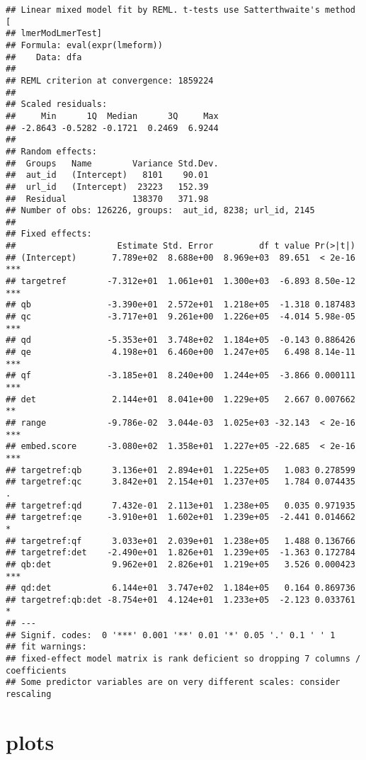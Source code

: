 \documentclass[
  12pt,
  oneside]{book}
\begin{document}
\begin{verbatim}
## Linear mixed model fit by REML. t-tests use Satterthwaite's method [
## lmerModLmerTest]
## Formula: eval(expr(lmeform))
##    Data: dfa
## 
## REML criterion at convergence: 1859224
## 
## Scaled residuals: 
##     Min      1Q  Median      3Q     Max 
## -2.8643 -0.5282 -0.1721  0.2469  6.9244 
## 
## Random effects:
##  Groups   Name        Variance Std.Dev.
##  aut_id   (Intercept)   8101    90.01  
##  url_id   (Intercept)  23223   152.39  
##  Residual             138370   371.98  
## Number of obs: 126226, groups:  aut_id, 8238; url_id, 2145
## 
## Fixed effects:
##                    Estimate Std. Error         df t value Pr(>|t|)    
## (Intercept)       7.789e+02  8.688e+00  8.969e+03  89.651  < 2e-16 ***
## targetref        -7.312e+01  1.061e+01  1.300e+03  -6.893 8.50e-12 ***
## qb               -3.390e+01  2.572e+01  1.218e+05  -1.318 0.187483    
## qc               -3.717e+01  9.261e+00  1.226e+05  -4.014 5.98e-05 ***
## qd               -5.353e+01  3.748e+02  1.184e+05  -0.143 0.886426    
## qe                4.198e+01  6.460e+00  1.247e+05   6.498 8.14e-11 ***
## qf               -3.185e+01  8.240e+00  1.244e+05  -3.866 0.000111 ***
## det               2.144e+01  8.041e+00  1.229e+05   2.667 0.007662 ** 
## range            -9.786e-02  3.044e-03  1.025e+03 -32.143  < 2e-16 ***
## embed.score      -3.080e+02  1.358e+01  1.227e+05 -22.685  < 2e-16 ***
## targetref:qb      3.136e+01  2.894e+01  1.225e+05   1.083 0.278599    
## targetref:qc      3.842e+01  2.154e+01  1.237e+05   1.784 0.074435 .  
## targetref:qd      7.432e-01  2.113e+01  1.238e+05   0.035 0.971935    
## targetref:qe     -3.910e+01  1.602e+01  1.239e+05  -2.441 0.014662 *  
## targetref:qf      3.033e+01  2.039e+01  1.238e+05   1.488 0.136766    
## targetref:det    -2.490e+01  1.826e+01  1.239e+05  -1.363 0.172784    
## qb:det            9.962e+01  2.826e+01  1.219e+05   3.526 0.000423 ***
## qd:det            6.144e+01  3.747e+02  1.184e+05   0.164 0.869736    
## targetref:qb:det -8.754e+01  4.124e+01  1.233e+05  -2.123 0.033761 *  
## ---
## Signif. codes:  0 '***' 0.001 '**' 0.01 '*' 0.05 '.' 0.1 ' ' 1
## fit warnings:
## fixed-effect model matrix is rank deficient so dropping 7 columns / coefficients
## Some predictor variables are on very different scales: consider rescaling
\end{verbatim}

\section{plots}\label{plots}
\end{document}
